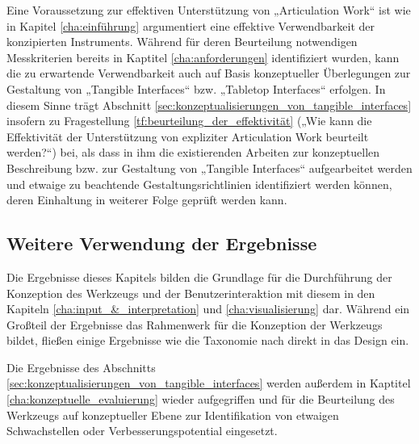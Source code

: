 Eine Voraussetzung zur effektiven Unterstützung von „Articulation Work“ ist wie in Kapitel \ref{cha:einführung} argumentiert eine effektive Verwendbarkeit der konzipierten Instruments. Während für deren Beurteilung notwendigen Messkriterien bereits in Kaptitel \ref{cha:anforderungen} identifiziert wurden, kann die zu erwartende Verwendbarkeit auch auf Basis konzeptueller Überlegungen zur Gestaltung von „Tangible Interfaces“  bzw. „Tabletop Interfaces“ erfolgen. In diesem Sinne trägt Abschnitt \ref{sec:konzeptualisierungen_von_tangible_interfaces} insofern zu Fragestellung \ref{tf:beurteilung_der_effektivität} („Wie kann die Effektivität der Unterstützung von expliziter Articulation Work beurteilt werden?“) bei, als dass in ihm die existierenden Arbeiten zur konzeptuellen Beschreibung bzw. zur Gestaltung von „Tangible Interfaces“ aufgearbeitet werden und etwaige zu beachtende Gestaltungsrichtlinien identifiziert werden können, deren Einhaltung in weiterer Folge geprüft werden kann.

\subsection{Weitere Verwendung der Ergebnisse}

Die Ergebnisse dieses Kapitels bilden die Grundlage für die Durchführung der Konzeption des Werkzeugs und der Benutzerinteraktion mit diesem in den Kapiteln \ref{cha:input_&_interpretation} und \ref{cha:visualisierung} dar. Während ein Großteil der Ergebnisse das Rahmenwerk für die Konzeption der Werkzeugs bildet, fließen einige Ergebnisse wie die Taxonomie nach \citet{Fishkin04} direkt in das Design ein.

Die Ergebnisse des Abschnitts \ref{sec:konzeptualisierungen_von_tangible_interfaces} werden außerdem in Kaptitel \ref{cha:konzeptuelle_evaluierung} wieder aufgegriffen und für die Beurteilung des Werkzeugs auf konzeptueller Ebene zur Identifikation von etwaigen Schwachstellen oder Verbesserungspotential eingesetzt.


